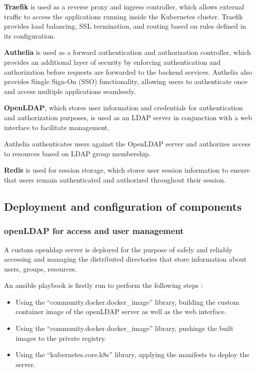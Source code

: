 \textbf{Traefik} is used as a reverse proxy and ingress controller, which allows external traffic to access the applications running inside the Kubernetes cluster. Traefik provides load balancing, SSL termination, and routing based on rules defined in its configuration. 

\textbf{Authelia} is used as a forward authentication and authorization controller, which provides an additional layer of security by enforcing authentication and authorization before requests are forwarded to the backend services. Authelia also provides Single Sign-On (SSO) functionality, allowing users to authenticate once and access multiple applications seamlessly. 

\textbf{OpenLDAP}, which stores user information and credentials for authentication and authorization purposes, is used as an LDAP server in conjunction with a web interface to facilitate management. 

Authelia authenticates users against the OpenLDAP server and authorizes access to resources based on LDAP group membership. 

\textbf{Redis} is used for session storage, which stores user session information to ensure that users remain authenticated and authorized throughout their session. 

 

\subsection{Deployment and configuration of components }

\subsubsection{openLDAP for access and user management  }

A custom openldap server is deployed for the purpose of safely and reliably accessing and managing the distributed directories that store information about users, groups, resources. 


An ansible playbook is firstly run to perform the following steps : 
\begin{itemize}[label={--}]
\item Using the “community.docker.docker\_image” library, building the custom container image of the openLDAP server as well as the web interface. 
\item Using the “community.docker.docker\_image” library, pushings the built images to the private registry. 
\item Using the “kubernetes.core.k8s” library, applying the manifests to deploy the server. 
\end{itemize}

